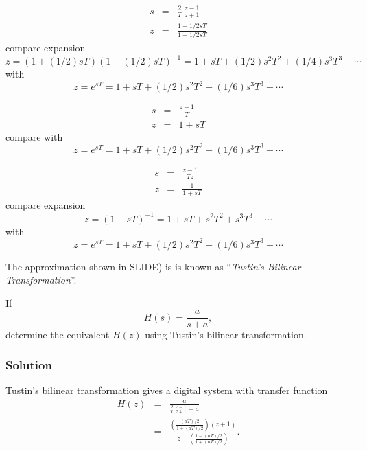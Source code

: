 \begin{slide}\label{slide:l11s22}

  \begin{eqnarray*}
     s &=& \frac{2}{T}\, \frac{z-1}{z+1} \\
     z &=& \frac{1 + 1/2 sT}{1 - 1/2 sT}
  \end{eqnarray*}
  compare expansion $$z=(1+ (1/2) sT)(1- (1/2) sT)^{-1} = 1 + sT + (1/2)
 s^2T^2 + (1/4) s^3T^3
 + \cdots$$  with $$z = e^{sT} = 1 + sT + (1/2) s^2T^2 + (1/6) s^3T^3 + \cdots$$
\end{slide}

\begin{slide}\label{slide:l11s20}

  \begin{eqnarray*}
     s &=& \frac{z-1}{T} \\
     z &=& 1 + sT
  \end{eqnarray*}
  compare with $$z = e^{sT} = 1 + sT + (1/2) s^2T^2 + (1/6) s^3T^3 + \cdots$$
\end{slide}

\begin{slide}\label{slide:l11s21}

  \begin{eqnarray*}
     s &=& \frac{z-1}{Tz} \\
     z &=& \frac{1}{1 + sT}
  \end{eqnarray*}
  compare expansion $$z=(1-sT)^{-1} = 1 + sT + s^2T^2 + s^3T^3
 + \cdots$$  with $$z = e^{sT} = 1 + sT + (1/2) s^2T^2 + (1/6) s^3T^3 + \cdots$$
\end{slide}


The approximation shown in SLIDE) is
is known as ``\emph{Tustin's Bilinear Transformation}''.

\begin{slide}\label{slide:l11s23}
  If \[H(s) = \frac{a}{s+a},\] determine the equivalent $H(z)$ using Tustin's
  bilinear transformation.
\end{slide}

\subsubsection{Solution} Tustin's
bilinear transformation gives a
 digital system with transfer function
 \begin{eqnarray*}
   H(z)&=& \frac{a}{\frac{2}{T}\,\frac{z-1}{z+1}+a} \\
       &=& \frac{\left(\frac{(aT)/2}{1+(aT)/2}\right)(z+1)}{z-\left(\frac{1-(aT)/2}{1+(aT)/2}\right)}.
 \end{eqnarray*}

